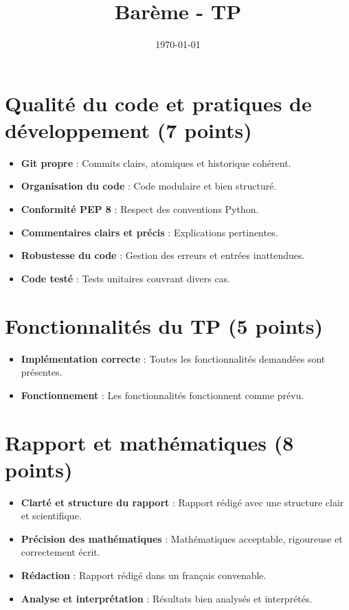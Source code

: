 \documentclass[a4paper,12pt]{article}
\title{Barème - TP}
\author{}
\date{\today}
\begin{document}
\makeonlytitle



\section*{Qualité du code et pratiques de développement (7 points)}
\begin{itemize}
    \item \textbf{Git propre} : Commits clairs, atomiques et historique cohérent.
    \item \textbf{Organisation du code} : Code modulaire et bien structuré.
    \item \textbf{Conformité PEP 8} : Respect des conventions Python.
    \item \textbf{Commentaires clairs et précis} : Explications pertinentes.
    \item \textbf{Robustesse du code} : Gestion des erreurs et entrées inattendues.
    \item \textbf{Code testé} : Tests unitaires couvrant divers cas.
\end{itemize}

\section*{Fonctionnalités du TP (5 points)}
\begin{itemize}
    \item \textbf{Implémentation correcte} : Toutes les fonctionnalités demandées sont présentes.
    \item \textbf{Fonctionnement} : Les fonctionnalités fonctionnent comme prévu.
\end{itemize}

\section*{Rapport et mathématiques (8 points)}
\begin{itemize}
    \item \textbf{Clarté et structure du rapport} : Rapport rédigé avec une structure clair et scientifique.
    \item \textbf{Précision des mathématiques} : Mathématiques acceptable, rigoureuse et correctement écrit.
    \item \textbf{Rédaction} : Rapport rédigé dans un français convenable.
    \item \textbf{Analyse et interprétation} : Résultats bien analysés et interprétés.
\end{itemize}
\end{document}
